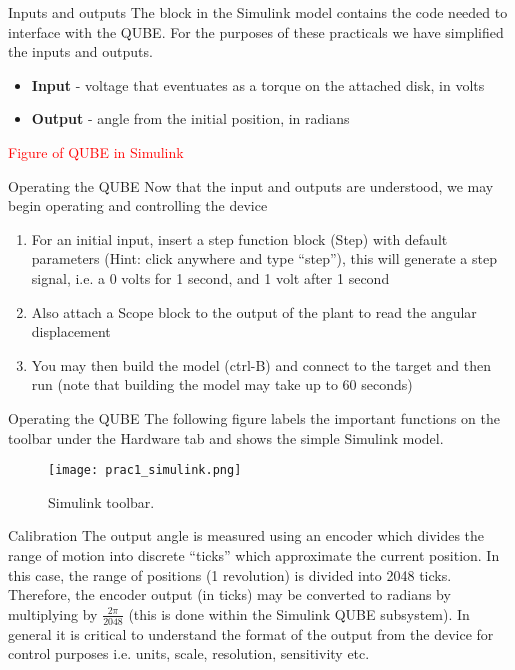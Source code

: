 \documentclass[9pt]{beamer-control}
\begin{document}

\begin{frame}{Inputs and outputs}
The block in the Simulink model contains the code needed to interface with the QUBE. For the purposes of these practicals we have simplified the inputs and outputs. 

\begin{itemize}
	\item \textbf{Input} - voltage that eventuates as a torque on the attached disk, in volts
	\item \textbf{Output} - angle from the initial position, in radians
\end{itemize}

\textcolor{red}{Figure of QUBE in Simulink}


\end{frame}




\begin{frame}{Operating the QUBE}
	Now that the input and outputs are understood, we may begin operating and controlling the device
	\begin{enumerate}
		\item For an initial input, insert a step function block (Step) with default parameters (Hint: click anywhere and type “step”), this will generate a step signal, i.e. a 0 volts for 1 second, and 1 volt after 1 second
		\item Also attach a Scope block to the output of the plant to read the angular displacement
		\item You may then build the model (ctrl-B) and connect to the target and then run (note that building the model may take up to 60 seconds)
	\end{enumerate}

\end{frame}

\begin{frame}{Operating the QUBE}
	The following figure labels the important functions on the toolbar under the Hardware tab and shows the simple Simulink model.
\begin{figure}
	\centering
	\texttt{[image: prac1\_simulink.png]}
	\caption{Simulink toolbar.}
\end{figure}
\end{frame}


\begin{frame}{Calibration}
	The output angle is measured using an encoder which divides the range of motion into discrete ``ticks” which approximate the current position. In this case, the range of positions (1 revolution) is divided into 2048 ticks. Therefore, the encoder output (in ticks) may be converted to radians by multiplying by $\tfrac{2\pi}{2048}$ (this is done within the Simulink QUBE subsystem). In general it is critical to understand the format of the output from the device for control purposes i.e. units, scale, resolution, sensitivity etc. 
\end{frame}
\end{document}
